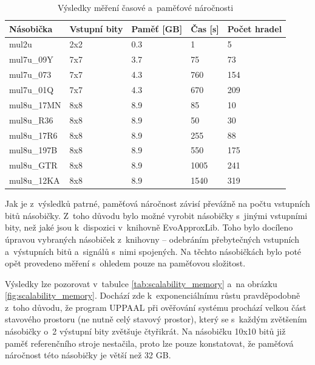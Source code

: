 \begin{table}[!ht]
    \centering
    \begin{tabular}{|l|l|l|l|l|}
        \textbf{Násobička} & \textbf{Vstupní bity} & \textbf{Paměť [GB]} & \textbf{Čas [s]} & \textbf{Počet hradel} \\ \hline
        mul2u & 2x2 & 0.3 & 1 & 5 \\ 
        mul7u\_09Y & 7x7 & 3.7 & 75 & 73 \\ 
        mul7u\_073 & 7x7 & 4.3 & 760 & 154 \\ 
        mul7u\_01Q & 7x7 & 4.3 & 670 & 209 \\ 
        mul8u\_17MN & 8x8 & 8.9 & 85 & 10 \\ 
        mul8u\_R36 & 8x8 & 8.9 & 50 & 30 \\ 
        mul8u\_17R6 & 8x8 & 8.9 & 255 & 88 \\ 
        mul8u\_197B & 8x8 & 8.9 & 550 & 175 \\ 
        mul8u\_GTR & 8x8 & 8.9 & 1005 & 241 \\ 
        mul8u\_12KA & 8x8 & 8.9 & 1540 & 319 \\ 
    \end{tabular}
    \caption{Výsledky měření časové a~paměťové náročnosti}
    \label{tab:scalability}
\end{table}

Jak je z~výsledků patrné, paměťová náročnost závisí převážně na počtu vstupních bitů násobičky. Z~toho důvodu bylo možné vyrobit násobičky s~jinými vstupními bity, než jaké jsou k~dispozici v~knihovně EvoApproxLib. Toho bylo docíleno úpravou vybraných násobiček z~knihovny -- odebráním přebytečných vstupních a~výstupních bitů a~signálů s~nimi spojených. Na těchto násobičkách bylo poté opět provedeno měření s~ohledem pouze na paměťovou složitost.

Výsledky lze pozorovat v~tabulce \ref{tab:scalability_memory} a~na obrázku \ref{fig:scalability_memory}. Dochází zde k~exponenciálnímu růstu pravděpodobně z~toho důvodu, že program UPPAAL při ověřování systému prochází velkou část stavového prostoru (ne nutně celý stavový prostor), který se s~každým zvětšením násobičky o~2 výstupní bity zvětšuje čtyřikrát. Na násobičku 10x10 bitů již paměť referenčního stroje nestačila, proto lze pouze konstatovat, že paměťová náročnost této násobičky je větší než 32 GB.

